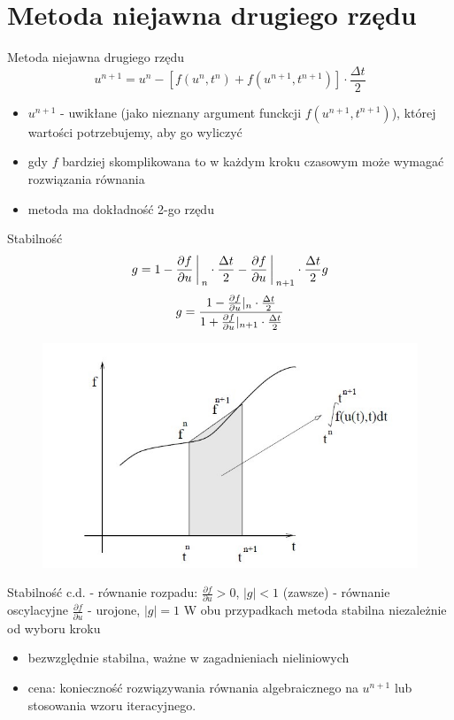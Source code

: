 \section{Metoda niejawna drugiego rzędu}
\begin{frame}{Metoda niejawna drugiego rzędu}
	$$u^{n+1} = u^n - [f(u^n,t^n)+f(u^{n+1},t^{n+1})]\cdot \frac{\Delta t}{2}$$
    \newline
    \begin{itemize}
        \item $u^{n+1}$ - uwikłane (jako nieznany argument funckcji $f(u^{n+1},t^{n+1})$), której wartości potrzebujemy, aby go wyliczyć
    \item gdy $f$ bardziej skomplikowana to w każdym kroku czasowym może wymagać rozwiązania równania
  
    \item metoda ma dokładność 2-go rzędu
    \end{itemize}
\end{frame}
\begin{frame}{Stabilność}
	$$g = 1-\frac{\partial f}{\partial u}\bigg\arrowvert_n \cdot\frac{\Delta t}{2}-\frac{\partial f}{\partial u}\bigg\arrowvert_{n+1}\cdot \frac{\Delta t}{2} g$$
	$$g=\frac{1-\frac{\partial f}{\partial u}\arrowvert_n \cdot \frac{\Delta t}{2}}{1+\frac{\partial f}{\partial u}\arrowvert_{n+1} \cdot \frac{\Delta t}{2}}$$
    \begin{figure}
    	\includegraphics[height=0.55\textheight]{img/22/stabilnosc.jpg}
    \end{figure}
\end{frame}
\begin{frame}{Stabilność c.d.}
	- równanie rozpadu: $\frac{\partial f}{\partial u} > 0$, \quad $|g| < 1$ (zawsze)
    \newline
    - równanie oscylacyjne $\frac{\partial f}{\partial u}$ - urojone, $|g| = 1$
    \newline\newline
    W obu przypadkach metoda stabilna niezależnie od wyboru kroku
    \begin{itemize}
      \item bezwzględnie stabilna, ważne w zagadnieniach nieliniowych
      \item cena: konieczność rozwiązywania równania algebraicznego na $u^{n+1}$ lub stosowania wzoru iteracyjnego.
    \end{itemize}
\end{frame}
